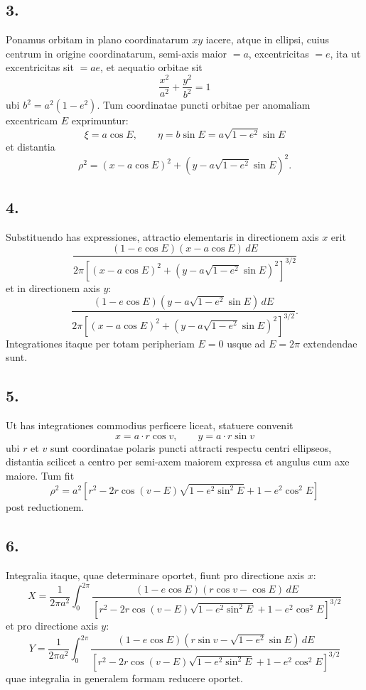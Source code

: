 \documentclass[12pt,a4paper]{article}
\theoremstyle{plain}
\begin{document}
\subsection*{3.}

Ponamus orbitam in plano coordinatarum $xy$ iacere, atque in ellipsi, cuius centrum in origine coordinatarum, semi-axis maior $= a$, excentricitas $= e$,
ita ut excentricitas sit $= ae$, et aequatio orbitae sit
\[
\frac{x^2}{a^2} + \frac{y^2}{b^2} = 1
\]
ubi $b^2 = a^2(1-e^2)$. Tum coordinatae puncti orbitae per anomaliam excentricam
$E$ exprimuntur:
\[
\xi = a\cos E,\qquad \eta = b\sin E = a\sqrt{1-e^2}\sin E
\]
et distantia
\[
\rho^2 = (x - a\cos E)^2 + (y - a\sqrt{1-e^2}\sin E)^2.
\]
\subsection*{4.}

Substituendo has expressiones, attractio elementaris in directionem axis $x$ erit
\[
\frac{(1-e\cos E)(x - a\cos E)\,dE}{2\pi\left[(x-a\cos E)^2 + (y-a\sqrt{1-e^2}\sin E)^2\right]^{3/2}}
\]
et in directionem axis $y$:
\[
\frac{(1-e\cos E)(y - a\sqrt{1-e^2}\sin E)\,dE}{2\pi\left[(x-a\cos E)^2 + (y-a\sqrt{1-e^2}\sin E)^2\right]^{3/2}}.
\]
Integrationes itaque per totam peripheriam $E = 0$ usque ad $E = 2\pi$ extendendae sunt.

\subsection*{5.}

Ut has integrationes commodius perficere liceat, statuere convenit
\[
x = a\cdot r\cos v,\qquad y = a\cdot r\sin v
\]
ubi $r$ et $v$ sunt coordinatae polaris puncti attracti respectu centri ellipseos, distantia scilicet a centro per semi-axem maiorem expressa et angulus cum axe
maiore. Tum fit
\[
\rho^2 = a^2\left[r^2 - 2r\cos(v-E)\sqrt{1-e^2\sin^2 E} + 1 - e^2\cos^2 E\right]
\]
post reductionem.

\subsection*{6.}

Integralia itaque, quae determinare oportet, fiunt pro directione axis $x$:
\[
X = \frac{1}{2\pi a^2}\int_0^{2\pi}\frac{(1-e\cos E)(r\cos v - \cos E)\,dE}{
\left[r^2 - 2r\cos(v-E)\sqrt{1-e^2\sin^2 E} + 1 - e^2\cos^2 E\right]^{3/2}}
\]
et pro directione axis $y$:
\[
Y = \frac{1}{2\pi a^2}\int_0^{2\pi}\frac{(1-e\cos E)(r\sin v - \sqrt{1-e^2}\sin E)\,dE}{
\left[r^2 - 2r\cos(v-E)\sqrt{1-e^2\sin^2 E} + 1 - e^2\cos^2 E\right]^{3/2}}
\]
quae integralia in generalem formam reducere oportet.
\end{document}
